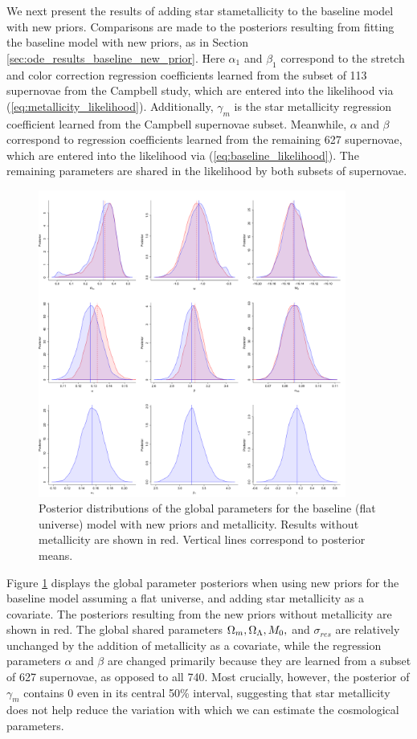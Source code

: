 We next present the results of adding star stametallicity to the baseline model with new priors. Comparisons are made to the posteriors resulting from fitting the baseline model with new priors, as in Section \ref{sec:ode_results_baseline_new_prior}. Here $\alpha_1$ and $\beta_1$ correspond to the stretch and color correction regression coefficients learned from the subset of 113 supernovae from the Campbell study, which are entered into the likelihood via (\ref{eq:metallicity_likelihood}). Additionally, $\gamma_{m}$ is the star metallicity regression coefficient learned from the Campbell supernovae subset. Meanwhile, $\alpha$ and $\beta$ correspond to regression coefficients learned from the remaining 627 supernovae, which are entered into the likelihood via (\ref{eq:baseline_likelihood}). The remaining parameters are shared in the likelihood by both subsets of supernovae. 

\begin{figure}
\centering
	\includegraphics[width=0.9\textwidth]{figures/ode/split_meth_flat_camp.png}
\caption{Posterior distributions of the global parameters for the baseline (flat universe) model with new priors and metallicity. Results without metallicity are shown in red. Vertical lines correspond to posterior means.}
\label{fig:ode_meth_flat}
\end{figure}

Figure \ref{fig:ode_meth_flat} displays the global parameter posteriors when using new priors for the baseline model assuming a flat universe, and adding star metallicity as a covariate. The posteriors resulting from the new priors without metallicity are shown in red. The global shared parameters $\Omega_m, \Omega_\Lambda, M_0,$ and $\sigma_{res}$ are relatively unchanged by the addition of metallicity as a covariate, while the regression parameters $\alpha$ and $\beta$ are changed primarily because they are learned from a subset of 627 supernovae, as opposed to all 740. Most crucially, however, the posterior of $\gamma_{m}$ contains 0 even in its central 50\% interval, suggesting that star metallicity does not help reduce the variation with which we can estimate the cosmological parameters.

